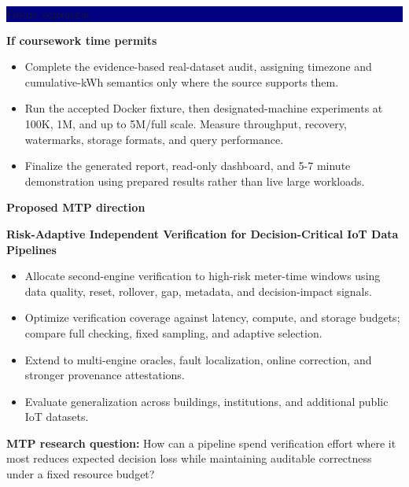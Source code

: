 \documentclass[10pt,a4paper]{article}
\newcommand{\columnheading}[1]{%
  \colorbox{navy}{\parbox{\dimexpr\linewidth-2\fboxsep\relax}{%
    \color{white}\bfseries\large\strut #1\strut}}\par\vspace{3mm}
}
\begin{document}
\hfill
\begin{minipage}[t]{0.315\textwidth}
\columnheading{Future expansion}

\textbf{If coursework time permits}
\begin{itemize}
  \item Complete the evidence-based real-dataset audit, assigning timezone and
    cumulative-kWh semantics only where the source supports them.
  \item Run the accepted Docker fixture, then designated-machine experiments at
    100K, 1M, and up to 5M/full scale. Measure throughput, recovery, watermarks,
    storage formats, and query performance.
  \item Finalize the generated report, read-only dashboard, and 5-7 minute
    demonstration using prepared results rather than live large workloads.
\end{itemize}

\textbf{Proposed MTP direction}

\textbf{Risk-Adaptive Independent Verification for Decision-Critical IoT Data
Pipelines}

\begin{itemize}
  \item Allocate second-engine verification to high-risk meter-time windows
    using data quality, reset, rollover, gap, metadata, and decision-impact
    signals.
  \item Optimize verification coverage against latency, compute, and storage
    budgets; compare full checking, fixed sampling, and adaptive selection.
  \item Extend to multi-engine oracles, fault localization, online correction,
    and stronger provenance attestations.
  \item Evaluate generalization across buildings, institutions, and additional
    public IoT datasets.
\end{itemize}

\colorbox{goldbg}{\parbox{\dimexpr\linewidth-2\fboxsep\relax}{%
\textbf{MTP research question:} How can a pipeline spend verification effort
where it most reduces expected decision loss while maintaining auditable
correctness under a fixed resource budget?}}
\end{minipage}

\vfill
{}
\end{document}
